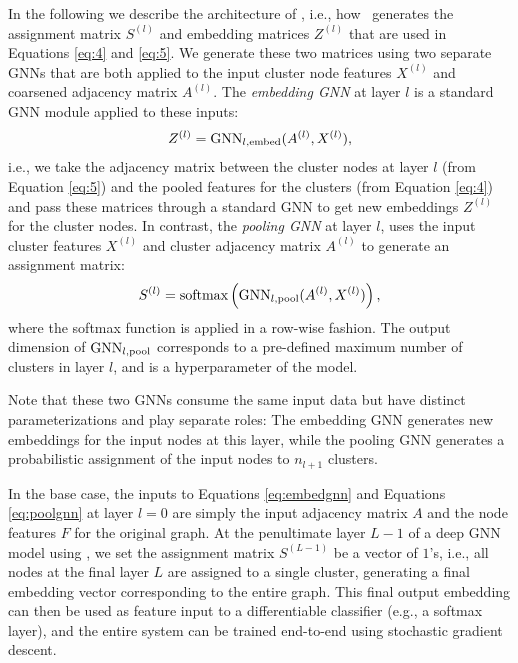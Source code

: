 In the following we describe the architecture of \name, i.e., how \name\ generates the assignment matrix $S^{(l)}$ and embedding matrices $Z^{(l)}$ that are used in Equations \eqref{eq:4} and \eqref{eq:5}.
We generate these two matrices using two separate GNNs that are both applied to the input cluster node features $X^{(l)}$ and coarsened adjacency matrix $A^{(l)}$.
The {\em embedding GNN} at layer $l$ is a standard GNN module applied to these inputs:
\begin{align}\label{eq:embedgnn}
   Z^{(l)} = \textrm{GNN}_{l, \textrm{embed}}(A^{(l)}, X^{(l)}),
\end{align}
i.e., we take the adjacency matrix between the cluster nodes at layer $l$ (from Equation \ref{eq:5}) and the pooled features for the clusters (from Equation \ref{eq:4}) and pass these matrices through a standard GNN to get new embeddings $Z^{(l)}$ for the cluster nodes. 
In contrast, the {\em pooling GNN} at layer $l$, uses the input cluster features $X^{(l)}$ and cluster adjacency matrix $A^{(l)}$ to generate an assignment matrix:
\begin{align}\label{eq:poolgnn}
    S^{(l)} = \textrm{softmax}\left(\textrm{GNN}_{l,\text{pool}}(A^{(l)}, X^{(l)})\right),
\end{align}
where the softmax function is applied in a row-wise fashion.
The output dimension of $\textrm{GNN}_{l,\text{pool}}$ corresponds to a pre-defined maximum number of clusters in layer $l$, and is a hyperparameter of the model.

Note that these two GNNs consume the same input data but have distinct parameterizations and play separate roles:
The embedding GNN generates new embeddings for the input nodes at this layer, while the pooling GNN generates a probabilistic assignment of the input nodes to $n_{l+1}$ clusters.

In the base case, the inputs to Equations \eqref{eq:embedgnn} and Equations \eqref{eq:poolgnn} at layer $l=0$ are simply the input adjacency matrix $A$ and the node features $F$ for the original graph.
At the penultimate layer $L-1$ of a deep GNN model using \name, we set the assignment matrix $S^{(L-1)}$ be a vector of $1$'s, i.e., all nodes at the final layer $L$ are assigned to a single cluster, generating a final embedding vector corresponding to the entire graph.
This final output embedding can then be used as feature input to a differentiable classifier (e.g., a softmax layer), and the entire system can be trained end-to-end using stochastic gradient descent. 

